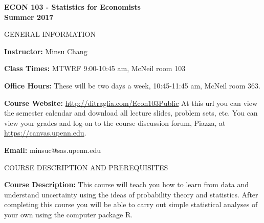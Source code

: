 \documentclass[11pt, letterpaper]{article}
\begin{document}
\thispagestyle{plain}

\begin{center}
\Large
\sc
\textbf{ECON 103 - Statistics for Economists}\\
\large
\textbf{Summer 2017}
\end{center}

\normalsize
\bigskip

\begin{center}
\small
GENERAL INFORMATION
\end{center}

\noindent \textbf{Instructor:} Minsu Chang 

\medskip

\noindent \textbf{Class Times:} MTWRF 9:00-10:45 am, McNeil room 103

\medskip


\noindent \textbf{Office Hours:} These will be two days a week, 10:45-11:45 am, McNeil room 363.


\medskip

 
\noindent \textbf{Course Website:} \url{http://ditraglia.com/Econ103Public} At this url you can view the semester calendar and download all lecture slides, problem sets, etc.
You can view your grades and log-on to the course discussion forum, Piazza, at \url{https://canvas.upenn.edu}.

\medskip

\noindent \textbf{Email:} minsuc@sas.upenn.edu


\vspace{0.2in}

\begin{center}
\small
COURSE DESCRIPTION AND PREREQUISITES
\end{center}


\noindent \textbf{Course Description:} 
This course will teach you how to learn from data and understand uncertainty using the ideas of probability theory and statistics. 
After completing this course you will be able to carry out simple statistical analyses of your own using the computer package R.


\medskip

\end{document}
